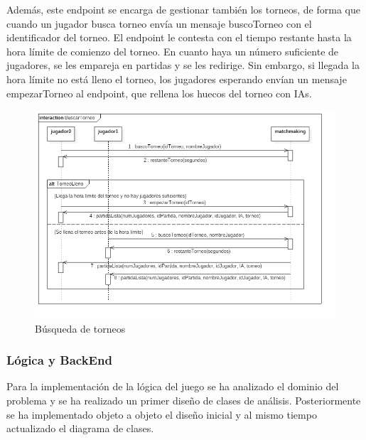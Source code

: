 Además, este endpoint se encarga de gestionar también los torneos, de forma que cuando un jugador busca torneo envía un mensaje buscoTorneo
con el identificador del torneo. El endpoint le contesta con el tiempo restante hasta la hora límite de comienzo del torneo. En cuanto haya
un número suficiente de jugadores, se les empareja en partidas y se les redirige. Sin embargo, si llegada la hora límite no está lleno el torneo,
los jugadores esperando envían un mensaje empezarTorneo al endpoint, que rellena los huecos del torneo con IAs.\\

\begin{figure}[H]
  \includegraphics[width=\linewidth]{figuras/diagramasSecuencia/buscarTorneo.png}
  \caption{Búsqueda de torneos}
  \label{fig:buscarTorneo}
\end{figure}

\subsubsection{Lógica y BackEnd}

Para la implementación de la lógica del juego se ha analizado el dominio del problema y se ha realizado un primer diseño de clases de análisis. Posteriormente se ha implementado objeto a objeto el diseño inicial y al mismo tiempo actualizado el diagrama de clases. 


